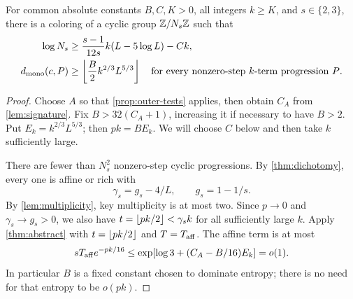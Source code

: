 \begin{theorem}\label{thm:cyclic}
For common absolute constants \(B,C,K>0\), all integers \(k\ge K\),
and \(s\in\{2,3\}\), there is a coloring of a cyclic group
\(\mathbb Z/N_s\mathbb Z\) such that
\begin{align}
 \log N_s&\ge
 \frac{s-1}{12s}k(L-5\log L)-Ck,\label{eq:cyclic-size}\\
 d_{\rm mono}(c,P)&\ge
 \left\lfloor \frac B2 k^{2/3}L^{5/3}\right\rfloor
 \quad\text{for every nonzero-step \(k\)-term progression \(P\)}.
 \label{eq:cyclic-robust}
\end{align}
\end{theorem}

\begin{proof}
Choose \(A\) so that \cref{prop:outer-tests} applies, then obtain
\(C_A\) from \cref{lem:signature}.
Fix \(B>32(C_A+1)\), increasing it if necessary to have \(B>2\).
Put \(E_k=k^{2/3}L^{5/3}\); then \(pk=BE_k\).
We will choose \(C\) below and then take \(k\) sufficiently large.

There are fewer than \(N_s^2\) nonzero-step cyclic progressions.
By \cref{thm:dichotomy}, every one is affine or rich with
\[
 \gamma_s=g_s-4/L,\qquad g_s=1-1/s.
\]
By \cref{lem:multiplicity}, key multiplicity is at most two.
Since \(p\to0\) and \(\gamma_s\to g_s>0\), we also have
\(t=\left\lfloor pk/2\right\rfloor<\gamma_s k\) for all sufficiently large \(k\).
Apply \cref{thm:abstract} with \(t=\left\lfloor pk/2\right\rfloor\) and \(T=T_{\rm aff}\).
The affine term is at most
\[
 sT_{\rm aff}e^{-pk/16}
 \le \exp\!\left[\log3+(C_A-B/16)E_k\right]=o(1).
\]
In particular \(B\) is a fixed constant chosen to dominate entropy;
there is no need for that entropy to be \(o(pk)\).


\end{proof}
